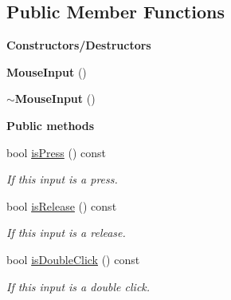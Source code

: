 \subsection*{Public Member Functions}
\begin{Indent}\textbf{ Constructors/\+Destructors}\par
\begin{DoxyCompactItemize}
\item 
\mbox{\label{structrev_1_1_mouse_input_ad6f274b41f80e5eeb9e2b61e612291fa}} 
{\bfseries Mouse\+Input} ()
\item 
\mbox{\label{structrev_1_1_mouse_input_acec480ba41729cd23abfe7f5bec187aa}} 
{\bfseries $\sim$\+Mouse\+Input} ()
\end{DoxyCompactItemize}
\end{Indent}
\begin{Indent}\textbf{ Public methods}\par
\begin{DoxyCompactItemize}
\item 
\mbox{\label{structrev_1_1_mouse_input_a9aaeddbfc14b0dae0bcf4b08e6de0dd1}} 
bool \mbox{\hyperlink{structrev_1_1_mouse_input_a9aaeddbfc14b0dae0bcf4b08e6de0dd1}{is\+Press}} () const
\begin{DoxyCompactList}\small\item\em If this input is a press. \end{DoxyCompactList}\item 
\mbox{\label{structrev_1_1_mouse_input_ae73cc367a85fa09d08c684d45dcbef6e}} 
bool \mbox{\hyperlink{structrev_1_1_mouse_input_ae73cc367a85fa09d08c684d45dcbef6e}{is\+Release}} () const
\begin{DoxyCompactList}\small\item\em If this input is a release. \end{DoxyCompactList}\item 
\mbox{\label{structrev_1_1_mouse_input_a03a7e6217c4ab5302a7b23c5bf8cb585}} 
bool \mbox{\hyperlink{structrev_1_1_mouse_input_a03a7e6217c4ab5302a7b23c5bf8cb585}{is\+Double\+Click}} () const
\begin{DoxyCompactList}\small\item\em If this input is a double click. \end{DoxyCompactList}\end{DoxyCompactItemize}
\end{Indent}
